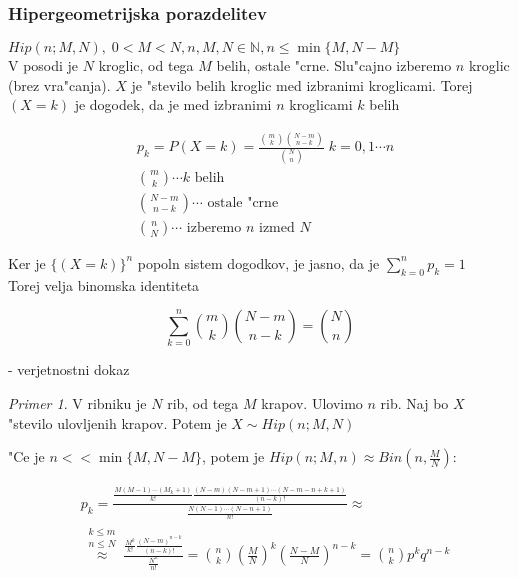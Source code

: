 \documentclass[a4paper,12pt]{article}
\theoremstyle{definition}
\theoremstyle{remark}
\newtheorem*{ex}{Primer}
\newcommand{\N}{\mathbb{N}}
\begin{document}
\subsubsection{Hipergeometrijska porazdelitev}

$Hip(n; M, N), \; 0 < M < N, n,M,N \in \N, n \leq \min\{M, N-M\}$ \\
V posodi je $N$ kroglic, od tega $M$ belih, ostale "crne. Slu"cajno izberemo $n$ kroglic (brez vra"canja). $X$ je
"stevilo belih kroglic med izbranimi kroglicami. Torej $(X=k)$ je dogodek, da je med izbranimi $n$ kroglicami $k$
belih

\begin{align*}
    &p_k = P(X = k) = \frac{\binom{m}{k} \binom{N-m}{n-k}}{\binom{N}{n}} \; k = 0, 1 \cdots n \\
    &\binom{m}{k} \cdots k \text{ belih} \\
    &\binom{N-m}{n-k} \cdots \text{ ostale "crne} \\
    &\binom{n}{N} \cdots \text{ izberemo } n \text{ izmed } N
\end{align*}

Ker je $\{(X = k)\}^n$ popoln sistem dogodkov, je jasno, da je $\sum_{k=0}^{n} p_k = 1$ \\
Torej velja binomska identiteta

\begin{equation*}
    \sum_{k=0}^{n} \binom{m}{k} \binom{N-m}{n-k} = \binom{N}{n}
\end{equation*}

- verjetnostni dokaz

\begin{ex}
    V ribniku je $N$ rib, od tega $M$ krapov. Ulovimo $n$ rib. Naj bo $X$ "stevilo ulovljenih krapov. Potem je
    $X \sim Hip(n; M, N)$
\end{ex}

"Ce je $n << \min\{M, N-M\}$, potem je $Hip(n; M, n) \approx Bin(n, \frac{M}{N})$:

\begin{align*}
    &p_k = \frac{\frac{M(M-1) \cdots (M_k+1)}{k!} \frac{(N-m)(N-m+1) \cdots (N-m-n+k+1)}{(n-k)!}}
        {\frac{N(N-1) \cdots (N-n+1)}{n!}} \approx \\
    &\stackrel{\substack{k \leq m \\ n \leq N}}{\approx} \frac{\frac{M^k}{k!} \frac{(N-m)^{n-k}}{(n-k)!}}
        {\frac{N^n}{n!}} = \binom{n}{k} (\frac{M}{N})^k (\frac{N-M}{N})^{n-k} = \binom{n}{k} p^k q^{n-k}
\end{align*}
\end{document}
